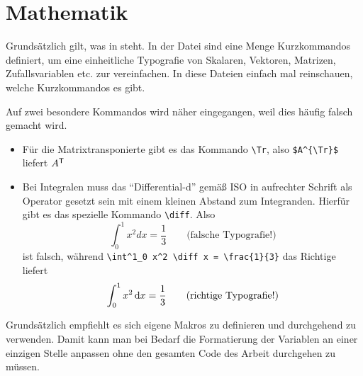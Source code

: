 \section{Mathematik}%
\label{sec:Mathe}
%
Grundsätzlich gilt, was in \parencites{ams1999a}{ams1999b} steht. In der Datei
 sind eine Menge Kurzkommandos definiert,
um eine einheitliche Typografie von
Skalaren, Vektoren, Matrizen,
Zufallsvariablen etc. zur vereinfachen.
In diese Dateien einfach mal reinschauen, welche Kurzkommandos es gibt.

Auf zwei besondere Kommandos wird näher eingegangen,
weil dies häufig falsch gemacht wird.
\begin{itemize}
  \item Für die Matrixtransponierte gibt es das Kommando \verb#\Tr#, also
	\verb#$A^{\Tr}$# liefert $A^{\mathsf{T}}$
	
	\item Bei Integralen muss das \enquote{Differential-d} gemäß
	ISO in aufrechter Schrift als Operator gesetzt sein mit einem kleinen Abstand
	zum Integranden. Hierfür gibt es das spezielle Kommando \verb#\diff#. Also
	\begin{equation}
	 \int^1_0 x^2 d x = \frac{1}{3} \qquad \text{(falsche Typografie!)}
	\end{equation}
	ist falsch, während \verb#\int^1_0 x^2 \diff x = \frac{1}{3}# das Richtige
	liefert
	\begin{equation}
	 \int^1_0 x^2 \mathop{}\!\mathrm{d} x = \frac{1}{3} \qquad \text{(richtige Typografie!)}
	\end{equation}
\end{itemize}
Grundsätzlich empfiehlt es sich eigene Makros zu definieren und durchgehend zu verwenden.
Damit kann man bei Bedarf die Formatierung der Variablen an einer einzigen Stelle anpassen
ohne den gesamten Code des Arbeit durchgehen zu müssen.